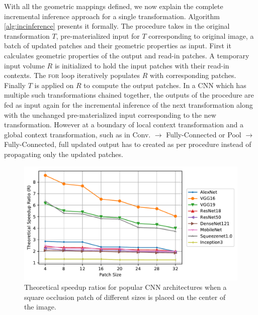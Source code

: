 With all the geometric mappings defined, we now explain the complete incremental inference approach for a single transformation. Algorithm \ref{alg:incinference} presents it formally.
The  procedure takes in the original transformation $T$, pre-materialized input for $T$ corresponding to original image, a batch of updated patches and their geometric properties as input.
First it calculates geometric properties of the output and read-in patches.
A temporary input volume $R$ is initialized to hold the input patches with their read-in contexts.
The \textsc{for} loop iteratively populates $R$ with corresponding patches.
Finally $T$ is applied on $R$ to compute the output patches.
In a CNN which has multiple such transformations chained together, the outputs of the  procedure are fed as input again for the incremental inference of the next transformation along with the unchanged pre-materialized input corresponding to the new transformation.
However at a boundary of local context transformation and a global context transformation, such as in Conv. $\rightarrow$ Fully-Connected or Pool $\rightarrow$ Fully-Connected, full updated output has to created as per  procedure instead of propagating only the updated patches.

\begin{figure}[t]
\includegraphics[width=\columnwidth]{images/redundancy_ratio}
\caption{Theoretical speedup ratios for popular CNN architectures when a square occlusion patch of different sizes is placed on the center of the image.}
\label{fig:redundancy_ratio}
\end{figure}

